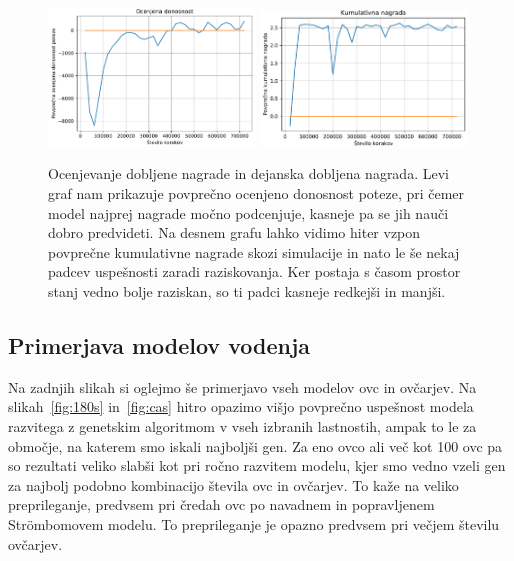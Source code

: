 \begin{figure}[H]  %
	\centering
	\includegraphics[width=0.49\textwidth]{../poglavja/grafi/donosnostAI2.pdf} \includegraphics[width=0.49\textwidth]{../poglavja/grafi/nagradeAI2.pdf}
	\caption[Ocenjevanje dobljene nagrade in dejanska dobljena nagrada]{Ocenjevanje dobljene nagrade in dejanska dobljena nagrada. Levi graf nam prikazuje povprečno ocenjeno donosnost poteze, pri čemer model najprej nagrade močno podcenjuje, kasneje pa se jih nauči dobro predvideti. Na desnem grafu lahko vidimo hiter vzpon povprečne kumulativne nagrade skozi simulacije in nato le še nekaj padcev uspešnosti zaradi raziskovanja. Ker postaja s časom prostor stanj vedno bolje raziskan, so ti padci kasneje redkejši in manjši.} %
	\label{fig:donosnost-nagrade}
\end{figure}

\subsection{Primerjava modelov vodenja}

Na zadnjih slikah si oglejmo še primerjavo vseh modelov ovc in ovčarjev. Na slikah~\ref{fig:180s} in~\ref{fig:cas} hitro opazimo višjo povprečno uspešnost modela razvitega z genetskim algoritmom v vseh izbranih lastnostih, ampak to le za območje, na katerem smo iskali najboljši gen. Za eno ovco ali več kot 100 ovc pa so rezultati veliko slabši kot pri ročno razvitem modelu, kjer smo vedno vzeli gen za najbolj podobno kombinacijo števila ovc in ovčarjev. To kaže na veliko preprileganje, predvsem pri čredah ovc po navadnem in popravljenem Str{\"o}mbomovem modelu. To preprileganje je opazno predvsem pri večjem številu ovčarjev.

